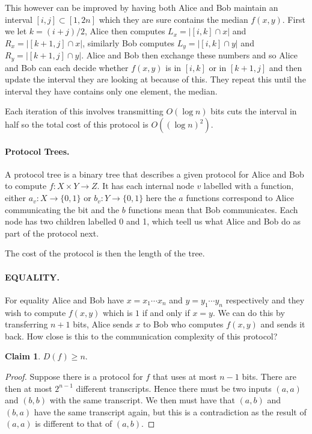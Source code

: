 \documentclass[11pt,a4paper]{article}
\theoremstyle{definition}
\newtheorem{claim}{Claim}
\begin{document}
This however can be improved by having both Alice and Bob maintain an interval $[i,j] \subset [1,2n]$ which they are sure contains the median $f(x,y)$.
First we let $k = (i+j)/2$, Alice then computes $L_x = |[i,k] \cap x|$ and $R_x = |[k+1, j] \cap x|$, similarly Bob computes $L_y = |[i,k] \cap y|$ and $R_y = |[k+1, j] \cap y|$.
Alice and Bob then exchange these numbers and so Alice and Bob can each decide whether $f(x,y)$ is in $[i,k]$ or in $[k+1,j]$ and then update the interval they are looking at because of this.
They repeat this until the interval they have contains only one element, the median.

Each iteration of this involves transmitting $O(\log n)$ bits cuts the interval in half so the total cost of this protocol is $O((\log n)^2)$.

\paragraph{Protocol Trees.}
A protocol tree is a binary tree that describes a given protocol for Alice and Bob to compute $f\colon X \times Y \to Z$.
It has each internal node $v$ labelled with a function, either $a_v\colon X \to \{0,1\}$ or $b_v\colon Y \to \{0,1\}$ here the $a$ functions correspond to Alice communicating the bit and the $b$ functions mean that Bob communicates.
Each node has two children labelled 0 and 1, which teell us what Alice and Bob do as part of the protocol next.

The cost of the protocol is then the length of the tree.

\paragraph{EQUALITY.}
For equality Alice and Bob have $x = x_1\cdots x_n$ and $y = y_1 \cdots y_n$ respectively and they wish to compute $f(x,y)$ which is $1$ if and only if $x = y$.
We can do this by transferring $n + 1$ bits, Alice sends $x$ to Bob who computes $f(x,y)$ and sends it back.
How close is this to the communication complexity of this protocol?
\begin{claim}
$D(f) \ge n$.
\end{claim}
\begin{proof}
Suppose there is a protocol for $f$ that uses at most $n-1$ bits.
There are then at most $2^{n-1}$ different transcripts.
Hence there must be two inputs $(a,a)$ and $(b,b)$ with the same transcript.
We then must have that $(a,b)$ and $(b,a)$ have the same transcript again, but this is a contradiction as the result of $(a,a)$ is different to that of $(a,b)$.
\end{proof}
\end{document}
